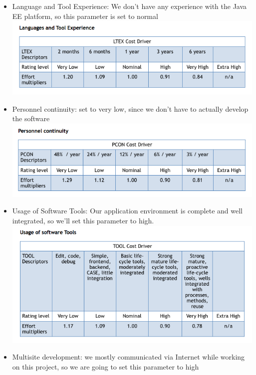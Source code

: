 \documentclass{article}
\begin{document}
\begin{flushleft}
\begin{itemize}
\vspace{0.5cm}
\item Language and Tool Experience: We don't have any experience with the Java EE platform, so this parameter is set to normal\\
\vspace{0.5cm}
\includegraphics[scale=0.5]{cocomo/13_LTEX}
\vspace{0.5cm}
\item Personnel continuity: set to very low, since we don't have to actually develop the software\\
\vspace{0.5cm}
\includegraphics[scale=0.5]{cocomo/14_PCON}
\vspace{0.5cm}
\item Usage of Software Tools: Our application environment is complete and well integrated, so
we'll set this parameter to high.\\
 \vspace{0.5cm}
\includegraphics[scale=0.5]{cocomo/15_TOOL}
\newpage
\item Multisite development: we mostly communicated via Internet while working on this project, so we are going to set this parameter to high\\

\end{itemize}
\end{flushleft}
\end{document}
